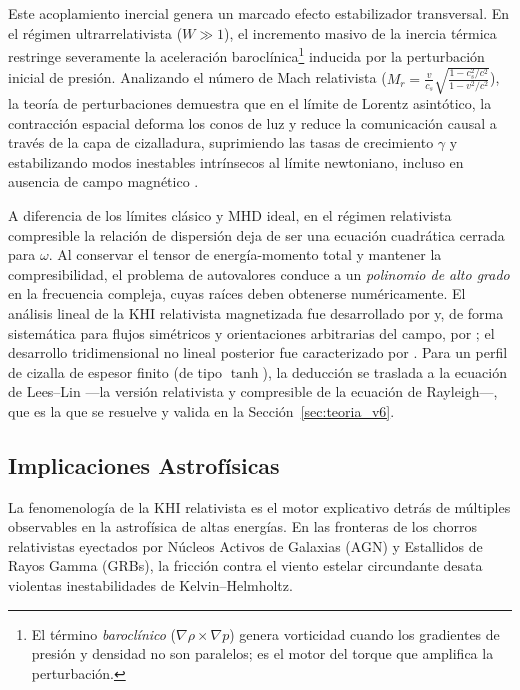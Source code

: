 Este acoplamiento inercial genera un marcado efecto estabilizador transversal. En el régimen ultrarrelativista ($W \gg 1$), el incremento masivo de la inercia térmica restringe severamente la aceleración baroclínica\footnote{El término \emph{baroclínico} ($\nabla\rho\times\nabla p$) genera vorticidad cuando los gradientes de presión y densidad no son paralelos; es el motor del torque que amplifica la perturbación.} inducida por la perturbación inicial de presión. Analizando el número de Mach relativista ($M_r = \frac{v}{c_s}\sqrt{\frac{1-c_s^2/c^2}{1-v^2/c^2}}$), la teoría de perturbaciones demuestra que en el límite de Lorentz asintótico, la contracción espacial deforma los conos de luz y reduce la comunicación causal a través de la capa de cizalladura, suprimiendo las tasas de crecimiento $\gamma$ y estabilizando modos inestables intrínsecos al límite newtoniano, incluso en ausencia de campo magnético \parencite{osmanov-2008, pimentel-2019}.

\primerparrafo A diferencia de los límites clásico y MHD ideal, en el régimen relativista compresible la relación de dispersión deja de ser una ecuación cuadrática cerrada para $\omega$. Al conservar el tensor de energía-momento total y mantener la compresibilidad, el problema de autovalores conduce a un \emph{polinomio de alto grado} en la frecuencia compleja, cuyas raíces deben obtenerse numéricamente. El análisis lineal de la KHI relativista magnetizada fue desarrollado por \textcite{osmanov-2008} y, de forma sistemática para flujos simétricos y orientaciones arbitrarias del campo, por \textcite{chow2023}; el desarrollo tridimensional no lineal posterior fue caracterizado por \textcite{bodo-2004}. Para un perfil de cizalla de espesor finito (de tipo $\tanh$), la deducción se traslada a la ecuación de Lees--Lin ---la versión relativista y compresible de la ecuación de Rayleigh---, que es la que se resuelve y valida en la Sección~\ref{sec:teoria_v6}.

\subsection{Implicaciones Astrofísicas}
\label{subsec:khi_rmhd_astro}

\primerparrafo La fenomenología de la KHI relativista es el motor explicativo detrás de múltiples observables en la astrofísica de altas energías. En las fronteras de los chorros relativistas eyectados por Núcleos Activos de Galaxias (AGN) y Estallidos de Rayos Gamma (GRBs), la fricción contra el viento estelar circundante desata violentas inestabilidades de Kelvin--Helmholtz.

